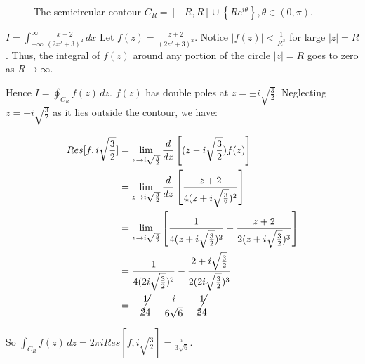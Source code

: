 \documentclass{physics_notes}
\begin{document}
\begin{figure}
	\centering
	\caption{The semicircular contour $C_R = [-R, R]\cup \left\{Re^{i\theta}\right\}, \theta \in (0,\pi)$.}
	\label{fig:semicircle_contour}
\end{figure}

\begin{example}{$I = \int_{-\infty}^\infty \frac{x+2}{(2x^2 + 3)^2}\, dx$}
	Let $f(z) = \frac{z + 2}{(2z^2 + 3)^2}$. Notice $|f(z)| < \frac{1}{R^3}$ for large $|z| = R$. Thus, the integral of $f(z)$ around any portion of the circle $|z| = R$ goes to zero as $R\to\infty$. 

	Hence $I = \oint_{C_R} f(z)\, dz$. $f(z)$ has double poles at $z = \pm i\sqrt{\frac{3}{2}}$. Neglecting $z = -i\sqrt{\frac{3}{2}}$ as it lies outside the contour, we have:

	\begin{align*}
		Res[f,i\sqrt{\frac{3}{2}}] &= \lim_{z\to i\sqrt{\frac{3}{2}}} \frac{d}{dz}\left[(z - i\sqrt{\frac{3}{2}})f(z)\right] \\
		&= \lim_{z\to i\sqrt{\frac{3}{2}}} \frac{d}{dz}\left[\frac{z+2}{4(z+i\sqrt{\frac{3}{2}})^2}\right] \\
		&= \lim_{z\to i\sqrt{\frac{3}{2}}} \left[\frac{1}{4(z + i\sqrt\frac{3}{2})^2} - \frac{z+2}{2(z + i\sqrt{\frac{3}{2}})^3}\right] \\
		&= \frac{1}{4(2i\sqrt{\frac{3}{2}})^2} - \frac{2 + i\sqrt{\frac{3}{2}}}{2(2i\sqrt{\frac{3}{2}})^3} \\
		&= -\cancel{\frac{1}{24}} - \frac{i}{6\sqrt{6}} + \cancel{\frac{1}{24}}
	\end{align*}

	So $\int_{C_R} f(z)\, dz = 2\pi i Res[f, i\sqrt{\frac{3}{2}}] = \frac{\pi}{3\sqrt{6}}$.
\end{example}
\end{document}
